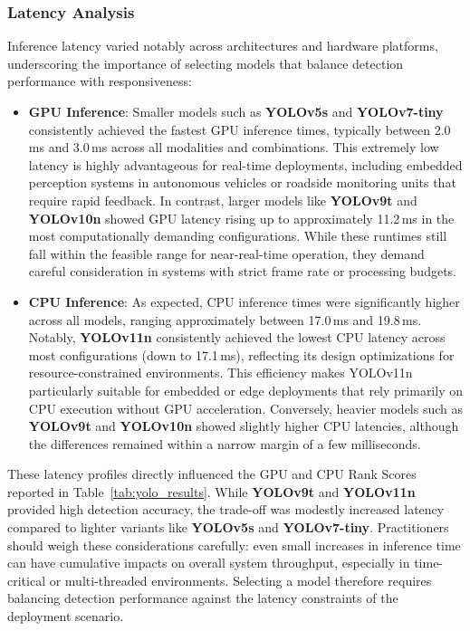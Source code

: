 \documentclass[runningheads]{llncs}
\begin{document}
\subsubsection{Latency Analysis}

Inference latency varied notably across architectures and hardware platforms, underscoring the importance of selecting models that balance detection performance with responsiveness:

\begin{itemize}
    \item \textbf{GPU Inference}: Smaller models such as \textbf{YOLOv5s} and \textbf{YOLOv7-tiny} consistently achieved the fastest GPU inference times, typically between 2.0\,ms and 3.0\,ms across all modalities and combinations. This extremely low latency is highly advantageous for real-time deployments, including embedded perception systems in autonomous vehicles or roadside monitoring units that require rapid feedback. In contrast, larger models like \textbf{YOLOv9t} and \textbf{YOLOv10n} showed GPU latency rising up to approximately 11.2\,ms in the most computationally demanding configurations. While these runtimes still fall within the feasible range for near-real-time operation, they demand careful consideration in systems with strict frame rate or processing budgets.
    
    \item \textbf{CPU Inference}: As expected, CPU inference times were significantly higher across all models, ranging approximately between 17.0\,ms and 19.8\,ms. Notably, \textbf{YOLOv11n} consistently achieved the lowest CPU latency across most configurations (down to 17.1\,ms), reflecting its design optimizations for resource-constrained environments. This efficiency makes YOLOv11n particularly suitable for embedded or edge deployments that rely primarily on CPU execution without GPU acceleration. Conversely, heavier models such as \textbf{YOLOv9t} and \textbf{YOLOv10n} showed slightly higher CPU latencies, although the differences remained within a narrow margin of a few milliseconds.
\end{itemize}

These latency profiles directly influenced the GPU and CPU Rank Scores reported in Table~\ref{tab:yolo_results}. While \textbf{YOLOv9t} and \textbf{YOLOv11n} provided high detection accuracy, the trade-off was modestly increased latency compared to lighter variants like \textbf{YOLOv5s} and \textbf{YOLOv7-tiny}. Practitioners should weigh these considerations carefully: even small increases in inference time can have cumulative impacts on overall system throughput, especially in time-critical or multi-threaded environments. Selecting a model therefore requires balancing detection performance against the latency constraints of the deployment scenario.
\end{document}
